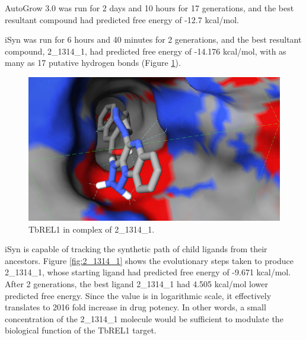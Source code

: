 AutoGrow 3.0 was run for 2 days and 10 hours for 17 generations, and the best resultant compound had predicted free energy of -12.7 kcal/mol.

iSyn was run for 6 hours and 40 minutes for 2 generations, and the best resultant compound, 2\_1314\_1, had predicted free energy of -14.176 kcal/mol, with as many as 17 putative hydrogen bonds (Figure \ref{fig:1XDN}).

\begin{figure}
\begin{center}
\includegraphics[width=\linewidth]{../isyn/1XDN.png}
\end{center}
\caption{TbREL1 in complex of 2\_1314\_1.}
\label{fig:1XDN}
\end{figure}

iSyn is capable of tracking the synthetic path of child ligands from their ancestors. Figure \ref{fig:2_1314_1} shows the evolutionary steps taken to produce 2\_1314\_1, whose starting ligand had predicted free energy of -9.671 kcal/mol. After 2 generations, the best ligand 2\_1314\_1 had 4.505 kcal/mol lower predicted free energy. Since the value is in logarithmic scale, it effectively translates to 2016 fold increase in drug potency. In other words, a small concentration of the 2\_1314\_1 molecule would be sufficient to modulate the biological function of the TbREL1 target.

